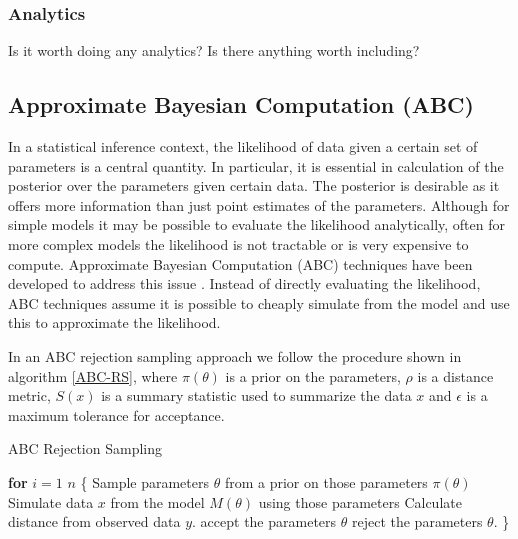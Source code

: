 \documentclass[twocolumn]{biophys}
\begin{document}
\subsubsection{Analytics}
Is it worth doing any analytics? Is there anything worth including?

\subsection{Approximate Bayesian Computation (ABC)}
In a statistical inference context, the likelihood of data given a certain set of parameters is a central quantity. 
In particular, it is essential in calculation of the posterior over the parameters given certain data. 
The posterior is desirable as it offers more information than just point estimates of the parameters.
Although for simple models it may be possible to evaluate the likelihood analytically, often for more complex models the likelihood is not tractable or is very expensive to compute.  
Approximate Bayesian Computation (ABC) techniques have been developed to address this issue \cite{beaumont2002approximate}.
Instead of directly evaluating the likelihood, ABC techniques assume it is possible to cheaply simulate from the model and use this to approximate the likelihood.

In an ABC rejection sampling approach we follow the procedure shown in algorithm \ref{ABC-RS}, where $\pi(\theta)$ is a prior on the parameters, $\rho$ is a distance metric, $S(x)$ is a summary statistic used to summarize the data $x$ and $\epsilon$ is a maximum tolerance for acceptance. 
\begin{algorithm}
\caption{ABC Rejection Sampling}\label{ABC-RS}
\begin{algorithmic}[1]
\State \textbf{for} $i=1$  $n$  \{
\State Sample parameters $\theta$ from a prior on those parameters $\pi (\theta)$ 
\State Simulate data $x$ from the model $M(\theta)$ using those parameters 
\State Calculate distance from observed data $y$.
 accept the parameters $\theta$
\Else \hspace{2pt} reject the parameters $\theta$.
\EndIf
\State \}
\end{algorithmic}
\end{algorithm}
\end{document}
